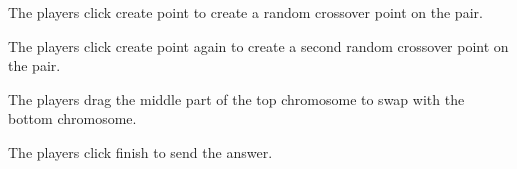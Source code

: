 \documentclass[12pt,oneside,openright,a4paper]{cpe-english-project}
\begin{document}
\begin{itemize}
\begin{enumerate}
		The players click create point to create a random crossover point on the pair. \\
		\begin{minipage}[c]{\textwidth}\centering {}  \end{minipage}
		The players click create point again to create a second random crossover point on the pair. \\
		\begin{minipage}[c]{\textwidth}\centering {}  \end{minipage}
		The players drag the middle part of the top chromosome to swap with the bottom chromosome. \\
		\begin{minipage}[c]{\textwidth}\centering {}  \end{minipage}
		The players click finish to send the answer. \\
	\end{enumerate}


\end{itemize}
\end{document}

